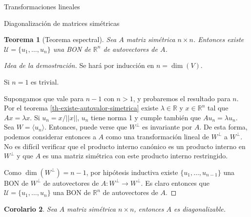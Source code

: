 \documentclass[a4paper,12pt,twoside,spanish,reqno]{amsbook}
\numberwithin{equation}{section}
\newtheorem{teorema}{Teorema}[section]
\newtheorem{corolario}[teorema]{Corolario}
\theoremstyle{definition}
\theoremstyle{remark}
\newcommand{\la}{\langle}
\newcommand{\ra}{\rangle}
\newcommand{\R}{\mathbb R}
\begin{document}
\begin{chapter}{Transformaciones lineales}
\begin{section}{Diagonalización de matrices simétricas}
    \begin{teorema}[Teorema espectral] Sea $A$ matriz simétrica $n \times n$. Entonces existe $\mathcal{U} = \{u_1,\ldots,u_n\}$ una BON de $\R^n$ de autovectores de $A$.
    \end{teorema}
    \begin{proof}[Idea de la demostración]		
        Se hará por inducción en $n= \dim(V)$.
        
        Si $n=1$ es trivial. 
        
        Supongamos que vale  para $n-1$ con $n >1$, y  probaremos el resultado para $n$. Por el teorema  \ref{th-existe-autovalor-simetrica} existe $\lambda \in \R$ y $x \in \R^n$ tal que $Ax = \lambda x$. Si $u_n = x/||x||$, $u_n$ tiene norma 1 y  cumple también que $Au_n = \lambda u_n$. Sea $W =\la u_n \ra$. Entonces, puede verse que $W^\perp$ es invariante por $A$. De esta forma, podemos considerar entonces a  $A$ como una transformación lineal de $W^\perp$ a $W^\perp$. No es difícil verificar que el producto interno canónico es un producto interno en $W^\perp$ y que $A$ es una matriz simétrica con este producto interno restringido.  
        
        Como $\dim(W^\perp) = n-1$, por hipótesis inductiva existe   $\{u_1,\ldots,u_{n-1}\}$ una BON de $W^\perp$ de autovectores de $A: W^\perp \to W^\perp$. Es claro entonces que $\mathcal{U} = \{u_1,\ldots,u_n\}$  una BON de $\R^n$ de autovectores de $A$. 
    \end{proof}

    \begin{corolario}
         Sea $A$ matriz simétrica $n \times n$, entonces $A$ es diagonalizable.
    \end{corolario}



\end{section}
\end{chapter}
\end{document}
